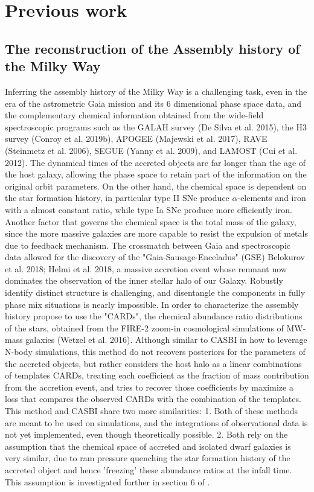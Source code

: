 \chapter{Previous work}

\section{The reconstruction of the Assembly history of the Milky Way}
Inferring the assembly history of the Milky Way is a challenging task, even in the era of the astrometric Gaia mission and its 6 dimensional 
phase space data, and the complementary chemical information obtained from the wide-field spectroscopic programs such as the GALAH survey
(De Silva et al. 2015), the H3 survey (Conroy et al. 2019b), APOGEE (Majewski et al. 2017), RAVE (Steinmetz et al. 2006),  SEGUE (Yanny et al. 2009), and 
LAMOST (Cui et al. 2012). The dynamical times of the accreted objects are far longer than the age of the host galaxy, allowing the 
phase space to retain part of the information on the original orbit parameters. On the other hand, the chemical space is dependent on the star formation history, in particular type II SNe produce $\alpha$-elements and iron with a almost constant ratio, while type Ia SNe produce more efficiently iron. Another factor that governs the chemical space is the total mass of the galaxy, since the more massive galaxies are more capable to resist the expulsion of metals due to feedback mechanism. The crossmatch between Gaia and spectroscopic data allowed for the discovery of the "Gaia-Sausage-Enceladus" (GSE) Belokurov et al. 2018; Helmi et al. 2018, a massive accretion event whose remnant now dominates the observation of the inner stellar halo of our Galaxy. Robustly identify distinct structure is challenging, and 
disentangle the components in fully phase mix situations is nearly impossible. In order to characterize the assembly history \cite{cunninghamReadingCARDsImprint2022}
propose to use the "CARDs", the chemical abundance ratio distributions of the stars, obtained from the FIRE-2 zoom-in cosmological simulations of MW-mass galaxies (Wetzel et al. 2016).
Although similar to CASBI in how to leverage N-body simulations, this method do not recovers posteriors for the parameters of the accreted objects, but rather considers the host halo as a linear combinations of templates CARDs, treating each coefficient as the fraction of mass contribution from the accretion event, and tries to recover those coefficients by maximize a loss that compares the observed CARDs with the combination of the templates. This method and CASBI share two more similarities: 1. Both of these methods are meant to be used on simulations, and the integrations of observational data is not yet implemented, even though theoretically possible. 2. Both rely on the assumption that the chemical space of accreted and isolated dwarf galaxies is very similar, due to ram pressure quenching the star formation history of the accreted object and hence 'freezing' these abundance ratios at the infall time. This assumption is investigated further in section 6 of \cite{cunninghamReadingCARDsImprint2022}. 
